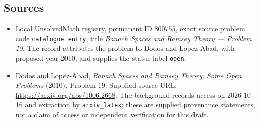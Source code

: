 \documentclass[11pt]{article}
\begin{document}
\subsection{Sources}
\begin{itemize}
\item Local UnsolvedMath registry, permanent ID \(800755\), exact source problem code \texttt{catalogue entry}, title \emph{Banach Spaces and Ramsey Theory --- Problem 19}. The record attributes the problem to Dodos and Lopez-Abad, with proposed year 2010, and supplies the status label \texttt{open}.
\item Dodos and Lopez-Abad, \emph{Banach Spaces and Ramsey Theory: Some Open Problems} (2010), Problem 19. Supplied source URL: \url{https://arxiv.org/abs/1006.2668}. The background records access on 2026-10-16 and extraction by \texttt{arxiv\_latex}; these are supplied provenance statements, not a claim of access or independent verification for this draft.
\end{itemize}
\end{document}
